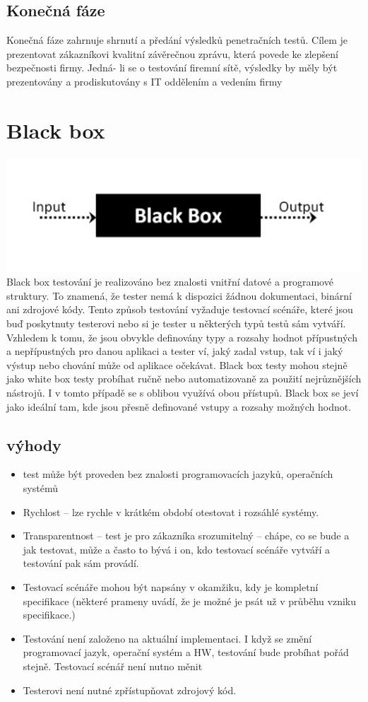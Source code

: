 \documentclass{article}
\begin{document}
\begin{large}
\subsection{Konečná fáze}Konečná fáze zahrnuje shrnutí a předání výsledků penetračních testů. Cílem je prezentovat
zákazníkovi kvalitní závěrečnou zprávu, která povede ke zlepšení bezpečnosti firmy. Jedná-
li se o testování firemní sítě, výsledky by měly být prezentovány a prodiskutovány s IT
oddělením a vedením firmy
\section{Black box}
\includegraphics{bb}
Black box testování je realizováno bez znalosti vnitřní datové a programové struktury.
To znamená, že tester nemá k dispozici žádnou dokumentaci, binární ani zdrojové kódy. Tento způsob testování vyžaduje testovací scénáře, které jsou buď poskytnuty testerovi nebo si je tester u některých typů testů sám vytváří. Vzhledem k tomu, že jsou obvykle definovány typy a rozsahy hodnot přípustných a nepřípustných pro danou aplikaci a tester ví, jaký zadal vstup, tak ví i jaký výstup nebo chování může od aplikace očekávat. Black box testy mohou stejně jako white box testy probíhat ručně nebo automatizovaně za použití nejrůznějších nástrojů. I v tomto případě se s oblibou využívá obou přístupů. Black box se jeví jako ideální tam, kde jsou přesně definované vstupy a rozsahy možných hodnot.
\subsection{výhody}
\begin{itemize}
    \item test může být proveden bez znalosti programovacích jazyků, operačních systémů
    \item Rychlost – lze rychle v krátkém období otestovat i rozsáhlé systémy.
    \item Transparentnost – test je pro zákazníka srozumitelný – chápe, co se bude a jak testovat, může a často to bývá i on, kdo testovací scénáře vytváří a testování pak sám provádí.
    \item Testovací scénáře mohou být napsány v okamžiku, kdy je kompletní specifikace (některé prameny uvádí, že je možné je psát už v průběhu vzniku specifikace.)
    \item Testování není založeno na aktuální implementaci. I když se změní programovací jazyk, operační systém a HW, testování bude probíhat pořád stejně. Testovací scénář není nutno měnit
    \item Testerovi není nutné zpřístupňovat zdrojový kód.
\end{itemize}

\end{large}
\end{document}
